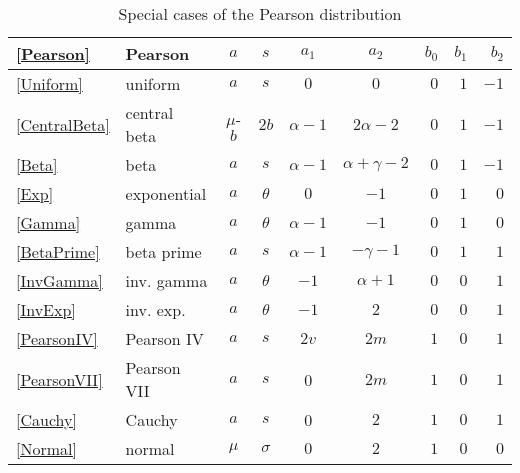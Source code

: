 \begin{table*}[tb]
\begin{center}
\caption[Pearson distribution -- Special cases]{Special cases of the Pearson distribution}
\label{PearsonTable2}
{\renewcommand{\arraystretch}{1.25} 
\begin{tabular}{llccccrrr}
\\
\eqref{Pearson}  & Pearson & $a$ & $s$ & $a_1$ & $a_2$  & $b_0$ & $b_1$ & $b_2$ \\
\hline
\eqref{Uniform} 	& uniform 		&  $a$  &  $s$  &  $0$  &  $0$    &     $0$    & $1$ & $-1$  \checked\\
\eqref{CentralBeta} 	& central beta 	&  $\mu$-$b$  &  $2b$  &  $\alpha-1$  &  $2\alpha-2$    &    $0$   & $1$ &$-1$ \checked\\
\eqref{Beta}     		& {beta} 		&  $a$  &  $s$  &  $\alpha-1$  &  $\alpha+\gamma-2$  &  $0$    &    $1$    &  $-1$  \checked \\
\eqref{Exp} 		& exponential 	&  $a$  &  $\theta$  &  $0$  &  $-1$    &    $0$    & $1$ & $0$ \checked \\
\eqref{Gamma} 	& gamma 		&  $a$  &  $\theta$  &  $\alpha-1$  &  $-1$    &    $0$    & $1$ & $0$ \checked \\
\eqref{BetaPrime} 	& {beta prime} 	&  $a$  &  $s$  &  $\alpha-1$  &  $-\gamma-1$  &  $0$    &    $1$    &  $1$\\
\eqref{InvGamma} 	& inv. gamma 	&  $a$  &  $\theta$  &  $-1$  &  $\alpha+1$  &      $0$    & $0$ & $1$ \checked \\
\eqref{InvExp} 		& inv. exp.&$a$ &  $\theta$  &  $-1$  &  $2$    &     $0$    & $0$ & $1$ \checked \\
\eqref{PearsonIV} 	& {Pearson IV} 	&  $a$  &  $s$  &  $2v$  &  $2m$  &  $1$    &    $0$    & $1$\\
\eqref{PearsonVII} 	& Pearson VII 	&  $a$  &  $s$  &  0  &  $2m$  &  $1$    &    $0$    & $1$ \checked\\
\eqref{Cauchy} 	& Cauchy 		&  $a$  &  $s$  &  0  &  $2$  &    $1$    &    $0$    & $1$  \checked \\
\eqref{Normal} 		& normal 		&$\mu$&  $\sigma$  &  $0$  &  $2$    &    $1$    &    $0$    & $0$ \\
\end{tabular} 
}
\end{center}
\end{table*}

